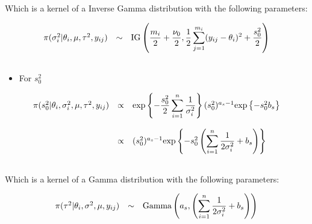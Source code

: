 \documentclass[a4paper, 11pt]{article}
\begin{document}
Which is a kernel of a Inverse Gamma distribution with the following parameters:

\begin{equation*}
\begin{array}{lcl ll }

\pi(\sigma_i^2|\theta_i, \mu, \tau^2, y_{ij}) & \sim &  \mbox{IG} \left( \dfrac{m_i}{2}+\dfrac{\nu_0}{2} , \dfrac{1}{2}\displaystyle\sum_{j=1}^{m_i}(y_{ij} - \theta_i)^2 + \dfrac{s_0^2}{2} \right)  \\\\

 \end{array}
\end{equation*}


\begin{itemize}
\item For $s_0^2$
\end{itemize}
\begin{equation*}
\begin{array}{lcl ll }

\pi(s_0^2|\theta_i, \sigma_i^2 , \mu, \tau^2, y_{ij}) & \propto & \mbox{exp}\left\{ - \dfrac{s_0^2}{2}\displaystyle\sum_{i=1}^{n}\dfrac{1}{\sigma_i^2}\right\} (s_0^2)^{a_s-1} \mbox{exp}\left\{ - s_0^2 b_s \right\} \\ \\

& \propto & (s_0^2)^{a_s-1} \mbox{exp}\left\{ - s_0^2\left( \displaystyle\sum_{i=1}^{n}\dfrac{1}{2\sigma_i^2} + b_s \right)\right\}  \\ \\
 \end{array}
\end{equation*}

Which is a kernel of a Gamma distribution with the following parameters:

\begin{equation*}
\begin{array}{lcl ll }

\pi(\tau^2| \theta_i, \sigma^2, \mu, y_{ij}) & \sim &  \mbox{Gamma} \left( a_s , \left( \displaystyle\sum_{i=1}^{n}\dfrac{1}{2\sigma_i^2} + b_s \right) \right)  \\\\

 \end{array}
\end{equation*}
\end{document}

